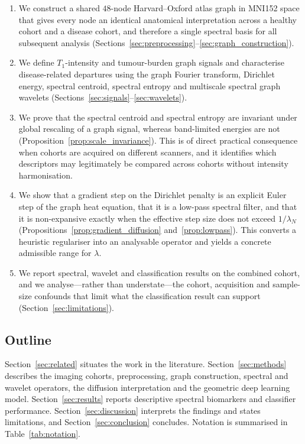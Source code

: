 \documentclass[11pt,reqno]{amsart}
\theoremstyle{plain}
\theoremstyle{definition}
\theoremstyle{remark}
\numberwithin{equation}{section}
\begin{document}
\begin{enumerate}[label=(\roman*),leftmargin=2.2em]
  \item We construct a shared $48$-node Harvard--Oxford atlas graph in MNI152
        space that gives every node an identical anatomical interpretation
        across a healthy cohort and a disease cohort, and therefore a single
        spectral basis for all subsequent analysis
        (Sections~\ref{sec:preprocessing}--\ref{sec:graph_construction}).
  \item We define $T_1$-intensity and tumour-burden graph signals and
        characterise disease-related departures using the graph Fourier
        transform, Dirichlet energy, spectral centroid, spectral entropy and
        multiscale spectral graph wavelets
        (Sections~\ref{sec:signals}--\ref{sec:wavelets}).
  \item We prove that the spectral centroid and spectral entropy are invariant
        under global rescaling of a graph signal, whereas band-limited energies
        are not (Proposition~\ref{prop:scale_invariance}). This is of direct
        practical consequence when cohorts are acquired on different scanners,
        and it identifies which descriptors may legitimately be compared across
        cohorts without intensity harmonisation.
  \item We show that a gradient step on the Dirichlet penalty is an explicit
        Euler step of the graph heat equation, that it is a low-pass spectral
        filter, and that it is non-expansive exactly when the effective step
        size does not exceed $1/\lambda_N$
        (Propositions~\ref{prop:gradient_diffusion} and~\ref{prop:lowpass}).
        This converts a heuristic regulariser into an analysable operator and
        yields a concrete admissible range for $\lambda$.
  \item We report spectral, wavelet and classification results on the combined
        cohort, and we analyse---rather than understate---the cohort,
        acquisition and sample-size confounds that limit what the
        classification result can support (Section~\ref{sec:limitations}).
\end{enumerate}

\subsection{Outline}

Section~\ref{sec:related} situates the work in the literature.
Section~\ref{sec:methods} describes the imaging cohorts, preprocessing, graph
construction, spectral and wavelet operators, the diffusion interpretation and
the geometric deep learning model. Section~\ref{sec:results} reports descriptive
spectral biomarkers and classifier performance. Section~\ref{sec:discussion}
interprets the findings and states limitations, and
Section~\ref{sec:conclusion} concludes. Notation is summarised in
Table~\ref{tab:notation}.
\end{document}
